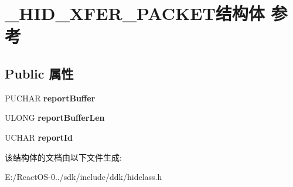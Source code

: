 \hypertarget{struct___h_i_d___x_f_e_r___p_a_c_k_e_t}{}\section{\+\_\+\+H\+I\+D\+\_\+\+X\+F\+E\+R\+\_\+\+P\+A\+C\+K\+E\+T结构体 参考}
\label{struct___h_i_d___x_f_e_r___p_a_c_k_e_t}
\subsection*{Public 属性}
\begin{DoxyCompactItemize}
\item 
\mbox{\label{struct___h_i_d___x_f_e_r___p_a_c_k_e_t_ad55e9483a11fe18694c362d9ebc0f991}} 
P\+U\+C\+H\+AR {\bfseries report\+Buffer}
\item 
\mbox{\label{struct___h_i_d___x_f_e_r___p_a_c_k_e_t_a58f71b6bc8ba270565d17d3b9a82621e}} 
U\+L\+O\+NG {\bfseries report\+Buffer\+Len}
\item 
\mbox{\label{struct___h_i_d___x_f_e_r___p_a_c_k_e_t_a786c9701ac77752e98aee52fbc0a53d4}} 
U\+C\+H\+AR {\bfseries report\+Id}
\end{DoxyCompactItemize}


该结构体的文档由以下文件生成\+:\begin{DoxyCompactItemize}
\item 
E\+:/\+React\+O\+S-\/0../sdk/include/ddk/hidclass.\+h\end{DoxyCompactItemize}
